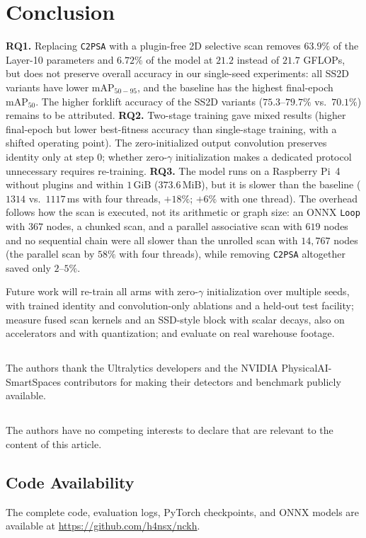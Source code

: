 \section{Conclusion}
\label{sec:conclusion}
\textbf{RQ1.} Replacing \texttt{C2PSA} with a plugin-free 2D selective scan removes $63.9\%$ of the Layer-10 parameters and $6.72\%$ of the model at $21.2$ instead of $21.7$ GFLOPs, but does not preserve overall accuracy in our single-seed experiments: all SS2D variants have lower $\text{mAP}_{50-95}$, and the baseline has the highest final-epoch $\text{mAP}_{50}$. The higher forklift accuracy of the SS2D variants ($75.3$--$79.7\%$ vs.\ $70.1\%$) remains to be attributed. \textbf{RQ2.} Two-stage training gave mixed results (higher final-epoch but lower best-fitness accuracy than single-stage training, with a shifted operating point). The zero-initialized output convolution preserves identity only at step $0$; whether zero-$\gamma$ initialization makes a dedicated protocol unnecessary requires re-training. \textbf{RQ3.} The model runs on a Raspberry Pi~4 without plugins and within $1$\,GiB ($373.6$\,MiB), but it is slower than the baseline ($1314$ vs.\ $1117$\,ms with four threads, $+18\%$; $+6\%$ with one thread). The overhead follows how the scan is executed, not its arithmetic or graph size: an ONNX \texttt{Loop} with $367$ nodes, a chunked scan, and a parallel associative scan with $619$ nodes and no sequential chain were all slower than the unrolled scan with $14{,}767$ nodes (the parallel scan by $58\%$ with four threads), while removing \texttt{C2PSA} altogether saved only $2$--$5\%$.

Future work will re-train all arms with zero-$\gamma$ initialization over multiple seeds, with trained identity and convolution-only ablations and a held-out test facility; measure fused scan kernels and an SSD-style block with scalar decays, also on accelerators and with quantization; and evaluate on real warehouse footage.

\begin{credits}
\subsection{\ackname} The authors thank the Ultralytics developers and the NVIDIA PhysicalAI-SmartSpaces contributors for making their detectors and benchmark publicly available.

\subsection{\discintname} The authors have no competing interests to declare that are relevant to the content of this article.
\end{credits}

\subsection{Code Availability} The complete code, evaluation logs, PyTorch checkpoints, and ONNX models are available at \url{https://github.com/h4nsx/nckh}.
